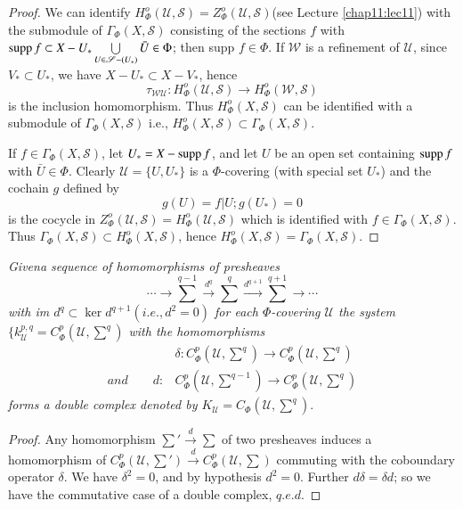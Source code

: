 \begin{proof}
We can identify $H^o_{\Phi}(\mathscr{U}, \mathscr{S})=
Z^o_{\Phi}(\mathscr{U}, \mathscr{S})$(see Lecture \ref{chap11:lec11}) with the
submodule of $\Gamma_{\Phi}(X, \mathscr{S})$ consisting of the
sections $f$ with $\operatorname{supp} f \subset X - U_* \bigcup\limits_{U \in
  \mathscr{S}-(U_*)} \bar{U} \in \Phi$; then supp $f \in \Phi$. If
$\mathscr{W}$ is a refinement of $\mathscr{U}$, since $V_* \subset
U_*$, we have $X- U_{\ast} \subset X - V_{\ast}$, hence  
$$
\tau_{\mathscr{W}\mathscr{U}}: H^o_{\Phi}(\mathscr{U},\mathscr{S}) \to
H^o_{\Phi}(\mathscr{W},\mathscr{S}) 
$$
is the inclusion homomorphism. Thus $H^o_{\Phi}(X,\mathscr{S})$ can be
identified with a submodule of $\Gamma_{\Phi}(X,\mathscr{S})$ i.e.,
$H^o_{\Phi}(X,\mathscr{S}) \subset \Gamma_{\Phi}(X,\mathscr{S})$. 

If $f \in \Gamma_{\Phi}(X,\mathscr{S})$, let $U_*=X-\operatorname{supp} f$, and let
$U$ be an open set containing $\operatorname{supp} f$ with $\bar{U} \in \Phi$. Clearly
$\mathscr{U}=\big\{U, U_* \big\}$ is a $\Phi$-covering (with special
set $U_*$) and the cochain $g$ defined by  
$$
g(U) =f|U ; g(U_*)= 0 
$$
is the cocycle in $Z^o_{\Phi}(\mathscr{U},\mathscr{S}) =
H^o_{\Phi}(\mathscr{U},\mathscr{S})$ which is identified with $f \in
\Gamma_{\Phi}(X, \mathscr{S})$. Thus $\Gamma_{\Phi}(X, \mathscr{S})
\subset H^o_{\Phi}(X, \mathscr{S})$, hence $H^o_{\Phi}(X,
\mathscr{S})= \Gamma_{\Phi}(X, \mathscr{S})$. 
\end{proof}

\textit{Given\pageoriginale a sequence of homomorphisms of presheaves}
$$
\cdots \to \sum^{q-1} \xrightarrow{d^q} \sum^q  \xrightarrow {d^{q+1}}
\sum^{q+1} \to \cdots 
$$
\textit{with im $d^q \subset \ker d^{q+1}(i.e., d^2 =0)$ for each
  $\Phi$-covering $\mathscr{U}$ the system $\{ k^{p,q}_{\mathscr{U}}=
  C^p_{\Phi} \left(\mathscr{U}, \sum^q \right)$ with the homomorphisms  
\begin{align*}
& \delta: C^p_{\Phi}(\mathscr{U},\sum^q) \to
  C^p_{\Phi}\left(\mathscr{U},\sum^q \right)\\ 
and \qquad d : & C^p_{\Phi}\left(\mathscr{U},\sum^{q-1} \right) \to
C^p_{\Phi} \left(\mathscr{U},\sum^q \right) 
\end{align*}
forms a double complex denoted by
$K_{\mathscr{U}}=C_{\Phi} \left(\mathscr{U},\sum^q \right)$}. 

\begin{proof}
Any homomorphism $\sum' \xrightarrow{d}\sum$ of two presheaves induces
a homomorphism of $C^p_{\Phi}\left(\mathscr{U},\sum' \right)\xrightarrow{d}
C^p_{\Phi} \left(\mathscr{U},\sum \right)$ commuting with the
cobou\-ndary operator $\delta$. We have $\delta^2 =0$, and by hypothesis
$d^2 = 0$. Further $d \delta = \delta d$; so we have the commutative
case of a double complex, $q.e.d$. 
\end{proof}

